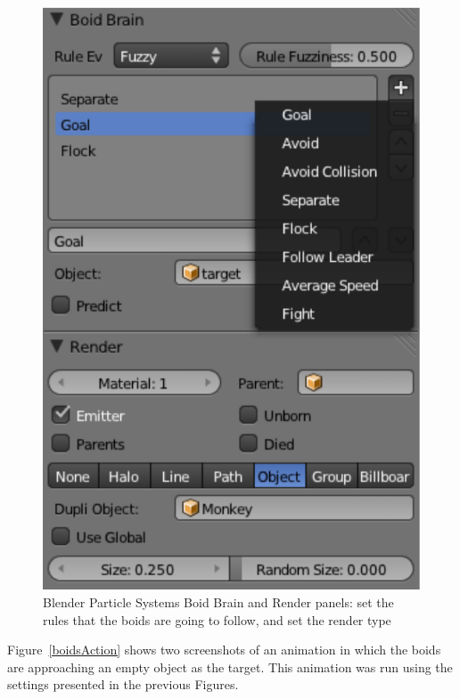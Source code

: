 \begin{figure}[htbp]
\begin{center}
\includegraphics[scale = 0.65]{figures/boidsBrain.pdf}
\caption{Blender Particle Systems Boid Brain and Render panels: set the rules that the boids are going to follow, and set the render type}
\label{boidsBrain}
\end{center}
\end{figure}

Figure~\ref{boidsAction} shows two screenshots of an animation in which the boids are approaching an empty object as the target. This animation was run using the settings presented in the previous Figures.

